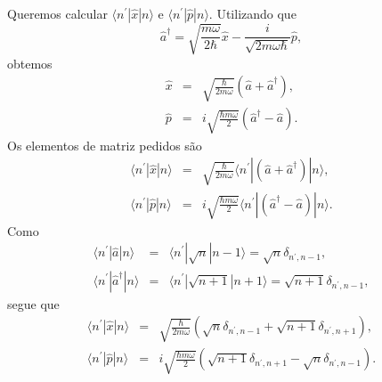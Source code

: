 \begin{enumerate}[start=1,label={\bfseries Q\arabic*.}]
\resposta Queremos calcular $\langle n^{\prime} | \hat{x} | n \rangle$ e $\langle n^{\prime} | \hat{p} | n \rangle$. Utilizando que
%
\begin{equation}
  \hat{a}^{\dagger} = \sqrt{\frac{m \omega}{2 \hbar}} \hat{x} - \frac{i}{\sqrt{2m\omega \hbar}} \hat{p} ,
\end{equation}
%
obtemos
%
\begin{equation}
\begin{array}{ccc}
   \hat{x} & = & \sqrt{\frac{\hbar}{2m\omega}} (\hat{a} + \hat{a}^{\dagger}) , \\
   \hat{p} & = & i \sqrt{\frac{\hbar m \omega}{2}} ( \hat{a}^{\dagger} - \hat{a} ) .
\end{array}
\end{equation}
%
Os elementos de matriz pedidos são
%
\begin{equation}
\begin{array}{ccc}
   \langle n^{\prime} | \hat{x} | n \rangle & = & \sqrt{\frac{\hbar}{2 m \omega}}  \langle n^{\prime} |(\hat{a} + \hat{a}^{\dagger})| n \rangle ,\\
   \langle n^{\prime} | \hat{p} | n \rangle & = & i \sqrt{\frac{\hbar m \omega}{2}} \langle n^{\prime} |( \hat{a}^{\dagger} - \hat{a} )| n \rangle.
\end{array}
\end{equation}
%
Como
%
\begin{equation}
  \begin{array}{ccc}
    \langle n^{\prime} | \hat{a} | n \rangle & = &  \langle n^{\prime} | \sqrt{n} | n - 1 \rangle = \sqrt{n} \delta_{n^{\prime}, n - 1} , \\
    \langle n^{\prime} | \hat{a}^{\dagger} | n \rangle & = &  \langle n^{\prime} | \sqrt{n+1} | n + 1 \rangle = \sqrt{n+1} \delta_{n^{\prime}, n - 1} ,
  \end{array}
\end{equation}
%
segue que
%
\begin{equation}
  \begin{array}{ccc}
    \langle n^{\prime} | \hat{x} | n \rangle & = &  \sqrt{\frac{\hbar}{2m\omega}} \left( \sqrt{n} \delta_{n^{\prime}, n - 1} + \sqrt{n+1} \delta_{n^{\prime}, n + 1} \right), \\
    \langle n^{\prime} | \hat{p} | n \rangle & = & i\sqrt{\frac{\hbar m \omega}{2}} \left( \sqrt{n+1} \delta_{n^{\prime}, n + 1} - \sqrt{n} \delta_{n^{\prime}, n - 1} \right) .
  \end{array}
\end{equation}
%




\end{enumerate}
